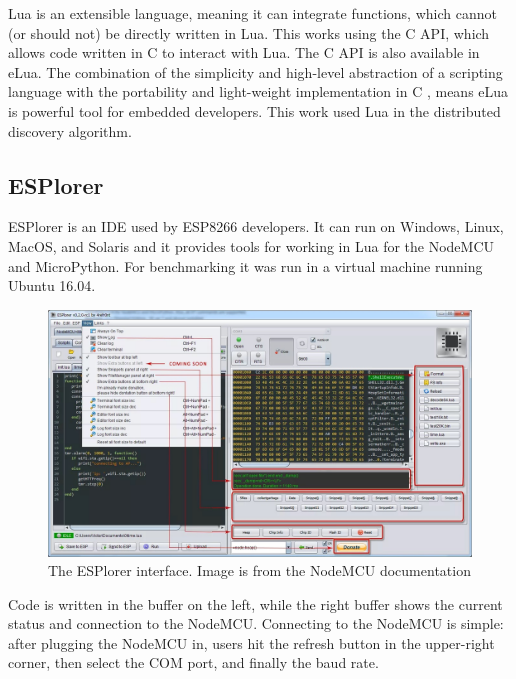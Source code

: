 Lua is an extensible language, meaning it can integrate functions, which cannot (or should not) be directly written in Lua. This works using the C API, which allows code written in C to interact with Lua. The C API is also available in eLua. The combination of the simplicity and high-level abstraction of a scripting language with the portability and light-weight implementation in C \cite{luaHandbook}, means eLua is powerful tool for embedded developers. This work used Lua in the distributed discovery algorithm.




\subsection{ESPlorer}
ESPlorer is an IDE used by ESP8266 developers. It can run on Windows, Linux, MacOS, and Solaris and it provides tools for working in Lua for the NodeMCU and MicroPython. For benchmarking it was run in a virtual machine running Ubuntu 16.04.

\begin{figure}[h]
\centering
\includegraphics[width=\textwidth]{Figures/ESPlorer.jpg}
\caption{The ESPlorer interface. Image is from the NodeMCU documentation\cite{Zeroday.2017}}
\end{figure}

Code is written in the buffer on the left, while the right buffer shows the current status and connection to the NodeMCU. Connecting to the NodeMCU is simple: after plugging the NodeMCU in, users hit the refresh button in the upper-right corner, then select the COM port, and finally the baud rate.

